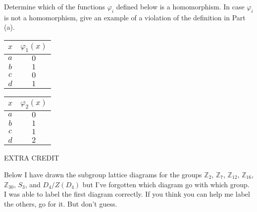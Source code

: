 \documentclass[fleqn,12pt]{article}
\newcommand{\<}{\ensuremath{\langle}}
\renewcommand{\>}{\ensuremath{\rangle}}
\newcommand{\Z}{\ensuremath{\mathbb{Z}}}
\begin{document}
\begin{enumerate}[{\bf 1.}]
\begin{enumerate}
\begin{center}
\end{center}

Determine which of the functions $\varphi_i$ defined below is a homomorphism.
In case $\varphi_i$ is not a homomorphism, give an example of 
a violation of the definition in Part (a).

\medskip
\begin{center}
\begin{tabular}{c|c}
  $x$ & $\varphi_1(x)$ \\
\hline
  $a$ & $0$\\\hline
  $b$ & $1$\\\hline
  $c$ & $0$\\\hline
  $d$ & $1$
\end{tabular}
\hskip3cm
\begin{tabular}{c|c}
  $x$ & $\varphi_2(x)$ \\
\hline
  $a$ & $0$\\\hline
  $b$ & $1$\\\hline
  $c$ & $1$\\\hline
  $d$ & $2$
\end{tabular}
\end{center}

\end{enumerate}
  \end{enumerate}
\newpage
\begin{center}
  EXTRA CREDIT
\end{center}
Below I have drawn the subgroup lattice diagrams for the groups $\Z_2$,
$\Z_7$, $\Z_{12}$, $\Z_{16}$, $\Z_{30}$, $S_3$, and  $D_4/Z(D_4)$ but I've
forgotten which diagram go with which group.  I was able to label the first
diagram correctly.  If you think you can help me label the others, go for
it. But don't guess. 
\end{document}
